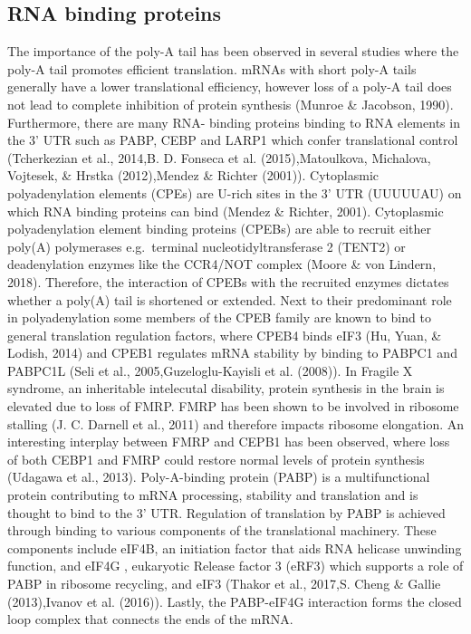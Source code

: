 \documentclass[12pt,openany]{book}
\begin{document}
\subsection{RNA binding proteins}

The importance of the poly-A tail has been observed in several studies
where the poly-A tail promotes efficient translation. mRNAs with short
poly-A tails generally have a lower translational efficiency, however
loss of a poly-A tail does not lead to complete inhibition of protein
synthesis (Munroe \& Jacobson, 1990). Furthermore, there are many RNA-
binding proteins binding to RNA elements in the 3' UTR such as PABP,
CEBP and LARP1 which confer translational control (Tcherkezian et al.,
2014,B. D. Fonseca et al. (2015),Matoulkova, Michalova, Vojtesek, \&
Hrstka (2012),Mendez \& Richter (2001)). Cytoplasmic polyadenylation
elements (CPEs) are U-rich sites in the 3' UTR (UUUUUAU) on which RNA
binding proteins can bind (Mendez \& Richter, 2001). Cytoplasmic
polyadenylation element binding proteins (CPEBs) are able to recruit
either poly(A) polymerases e.g.~terminal nucleotidyltransferase 2
(TENT2) or deadenylation enzymes like the CCR4/NOT complex (Moore \& von
Lindern, 2018). Therefore, the interaction of CPEBs with the recruited
enzymes dictates whether a poly(A) tail is shortened or extended. Next
to their predominant role in polyadenylation some members of the CPEB
family are known to bind to general translation regulation factors,
where CPEB4 binds eIF3 (Hu, Yuan, \& Lodish, 2014) and CPEB1 regulates
mRNA stability by binding to PABPC1 and PABPC1L (Seli et al.,
2005,Guzeloglu-Kayisli et al. (2008)). In Fragile X syndrome, an
inheritable intelecutal disability, protein synthesis in the brain is
elevated due to loss of FMRP. FMRP has been shown to be involved in
ribosome stalling (J. C. Darnell et al., 2011) and therefore impacts
ribosome elongation. An interesting interplay between FMRP and CEPB1 has
been observed, where loss of both CEBP1 and FMRP could restore normal
levels of protein synthesis (Udagawa et al., 2013). Poly-A-binding
protein (PABP) is a multifunctional protein contributing to mRNA
processing, stability and translation and is thought to bind to the 3'
UTR. Regulation of translation by PABP is achieved through binding to
various components of the translational machinery. These components
include eIF4B, an initiation factor that aids RNA helicase unwinding
function, and eIF4G , eukaryotic Release factor 3 (eRF3) which supports
a role of PABP in ribosome recycling, and eIF3 (Thakor et al., 2017,S.
Cheng \& Gallie (2013),Ivanov et al. (2016)). Lastly, the PABP-eIF4G
interaction forms the closed loop complex that connects the ends of the
mRNA.
\end{document}
